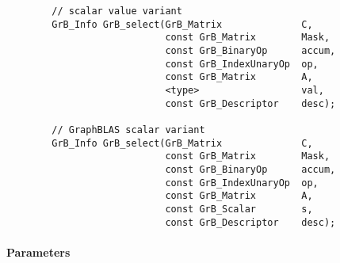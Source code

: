 \begin{verbatim}
        // scalar value variant
        GrB_Info GrB_select(GrB_Matrix              C,
                            const GrB_Matrix        Mask,
                            const GrB_BinaryOp      accum,
                            const GrB_IndexUnaryOp  op,
                            const GrB_Matrix        A,
                            <type>                  val,
                            const GrB_Descriptor    desc);

        // GraphBLAS scalar variant
        GrB_Info GrB_select(GrB_Matrix              C,
                            const GrB_Matrix        Mask,
                            const GrB_BinaryOp      accum,
                            const GrB_IndexUnaryOp  op,
                            const GrB_Matrix        A,
                            const GrB_Scalar        s,
                            const GrB_Descriptor    desc);
\end{verbatim}

\paragraph{Parameters}

